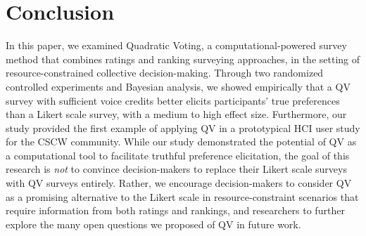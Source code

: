 \section{Conclusion} \label{conclusion}
In this paper, we examined Quadratic Voting, a computational-powered survey method that combines ratings and ranking surveying approaches, in the setting of resource-constrained collective decision-making. Through two randomized controlled experiments and Bayesian analysis, we showed empirically that a QV survey with sufficient voice credits better elicits participants' true preferences than a Likert scale survey, with a medium to high effect size. Furthermore, our study provided the first example of applying QV in a prototypical HCI user study for the CSCW community. While our study demonstrated the potential of QV as a computational tool to facilitate truthful preference elicitation, the goal of this research is \textit{not} to convince decision-makers to replace their Likert scale surveys with QV surveys entirely. Rather, we encourage decision-makers to consider QV as a promising alternative to the Likert scale in resource-constraint scenarios that require information from both ratings and rankings, and researchers to further explore the many open questions we proposed of QV in future work.

